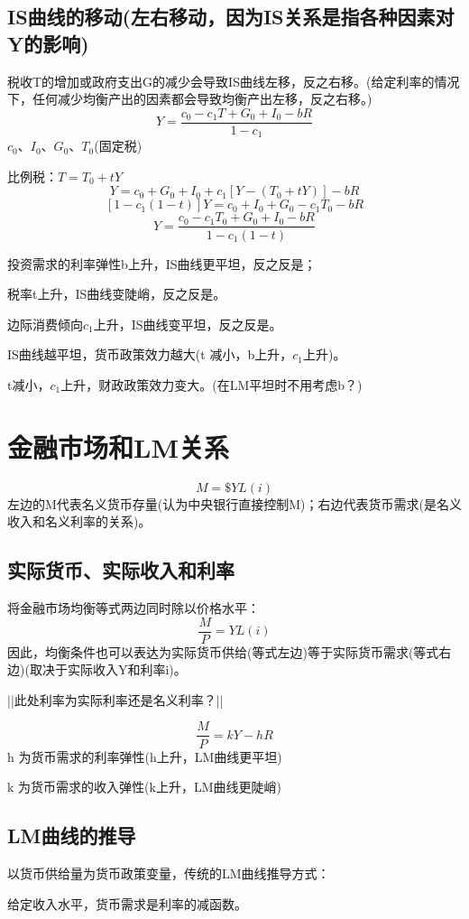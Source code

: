 \documentclass{article}
\begin{document}
\subsection{IS曲线的移动(左右移动，因为IS关系是指各种因素对Y的影响)}
税收T的增加或政府支出G的减少会导致IS曲线左移，反之右移。(给定利率的情况下，任何减少均衡产出的因素都会导致均衡产出左移，反之右移。)
\[
Y=\frac{c_0-c_1T+G_0+I_0-bR}{1-c_1}
\]
$ c_0 $、$ I_0 $、$ G_0 $、$ T_0 $(固定税)

\hspace*{\fill}

比例税：$ T=T_0+tY $
\[
Y=c_0+G_0+I_0+c_1[Y-(T_0+tY)]-bR
\]
\[
[1-c_1(1-t)]Y=c_0+I_0+G_0-c_1T_0-bR
\]
\[
Y=\frac{c_0-c_1T_0+G_0+I_0-bR}{1-c_1(1-t)}
\]

投资需求的利率弹性b上升，IS曲线更平坦，反之反是；

税率t上升，IS曲线变陡峭，反之反是。

边际消费倾向$ c_1 $上升，IS曲线变平坦，反之反是。  


IS曲线越平坦，货币政策效力越大(t 减小，b上升，$ c_1 $上升)。

t减小，$ c_1 $上升，财政政策效力变大。(在LM平坦时不用考虑b？)

\section{金融市场和LM关系}
\[
M=\$YL(i)
\]
左边的M代表名义货币存量(认为中央银行直接控制M)；右边代表货币需求(是名义收入和名义利率的关系)。

\subsection{实际货币、实际收入和利率}
将金融市场均衡等式两边同时除以价格水平：
\[
\frac{M}{P}=YL(i)
\]
因此，均衡条件也可以表达为实际货币供给(等式左边)等于实际货币需求(等式右边)(取决于实际收入Y和利率i)。

||此处利率为实际利率还是名义利率？||

\[
\frac{M}{P}=kY-hR
\]
h 为货币需求的利率弹性(h上升，LM曲线更平坦)

k 为货币需求的收入弹性(k上升，LM曲线更陡峭)
\subsection{LM曲线的推导}

以货币供给量为货币政策变量，传统的LM曲线推导方式：

给定收入水平，货币需求是利率的减函数。
\end{document}
